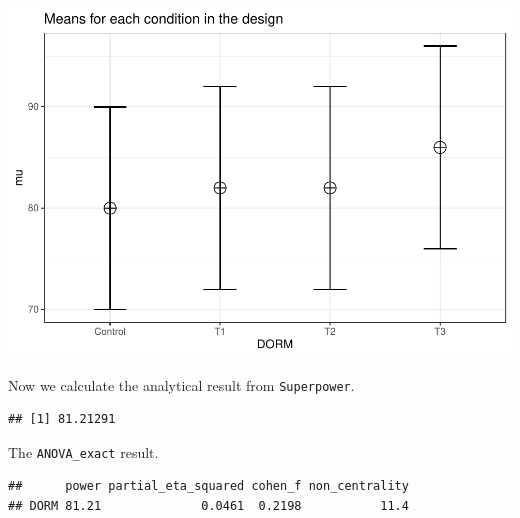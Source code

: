 \documentclass[]{book}
\newenvironment{Shaded}{\begin{snugshade}}{\end{snugshade}}
\newcommand{\DataTypeTok}[1]{\textcolor[rgb]{0.13,0.29,0.53}{#1}}
\newcommand{\KeywordTok}[1]{\textcolor[rgb]{0.13,0.29,0.53}{\textbf{#1}}}
\newcommand{\NormalTok}[1]{#1}
\newcommand{\OperatorTok}[1]{\textcolor[rgb]{0.81,0.36,0.00}{\textbf{#1}}}
\newcommand{\OtherTok}[1]{\textcolor[rgb]{0.56,0.35,0.01}{#1}}
\newcommand{\StringTok}[1]{\textcolor[rgb]{0.31,0.60,0.02}{#1}}
\begin{document}
\includegraphics{SuperpowerValidation_files/figure-latex/aberson_appendix-1.pdf}

Now we calculate the analytical result from \texttt{Superpower}.

\begin{Shaded}
\end{Shaded}

\begin{verbatim}
## [1] 81.21291
\end{verbatim}

The \texttt{ANOVA\_exact} result.

\begin{Shaded}
\end{Shaded}

\begin{verbatim}
##      power partial_eta_squared cohen_f non_centrality
## DORM 81.21              0.0461  0.2198           11.4
\end{verbatim}
\end{document}

